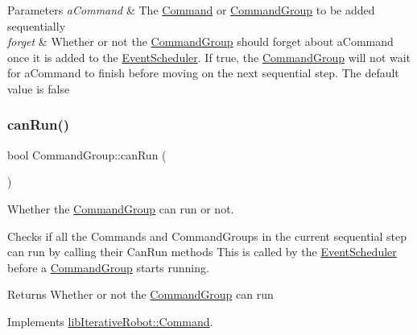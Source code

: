 \begin{DoxyParams}{Parameters}
{\em a\+Command} & The \mbox{\hyperlink{classlib_iterative_robot_1_1_command}{Command}} or \mbox{\hyperlink{classlib_iterative_robot_1_1_command_group}{Command\+Group}} to be added sequentially \\
\hline
{\em forget} & Whether or not the \mbox{\hyperlink{classlib_iterative_robot_1_1_command_group}{Command\+Group}} should forget about a\+Command once it is added to the \mbox{\hyperlink{classlib_iterative_robot_1_1_event_scheduler}{Event\+Scheduler}}. If true, the \mbox{\hyperlink{classlib_iterative_robot_1_1_command_group}{Command\+Group}} will not wait for a\+Command to finish before moving on the next sequential step. The default value is false \\
\hline
\end{DoxyParams}
\mbox{\label{classlib_iterative_robot_1_1_command_group_abd75c9b52e6b4ae5af1b6724e865311f}} 
\subsubsection{\texorpdfstring{canRun()}{canRun()}}
{\footnotesize\ttfamily bool Command\+Group\+::can\+Run (\begin{DoxyParamCaption}{ }\end{DoxyParamCaption})\hspace{0.3cm}{\ttfamily [virtual]}}



Whether the \mbox{\hyperlink{classlib_iterative_robot_1_1_command_group}{Command\+Group}} can run or not. 

Checks if all the Commands and Command\+Groups in the current sequential step can run by calling their Can\+Run methods This is called by the \mbox{\hyperlink{classlib_iterative_robot_1_1_event_scheduler}{Event\+Scheduler}} before a \mbox{\hyperlink{classlib_iterative_robot_1_1_command_group}{Command\+Group}} starts running. \begin{DoxyReturn}{Returns}
Whether or not the \mbox{\hyperlink{classlib_iterative_robot_1_1_command_group}{Command\+Group}} can run 
\end{DoxyReturn}


Implements \mbox{\hyperlink{classlib_iterative_robot_1_1_command_aebef0fdf029a15ee48fbb778c4265609}{lib\+Iterative\+Robot\+::\+Command}}.

